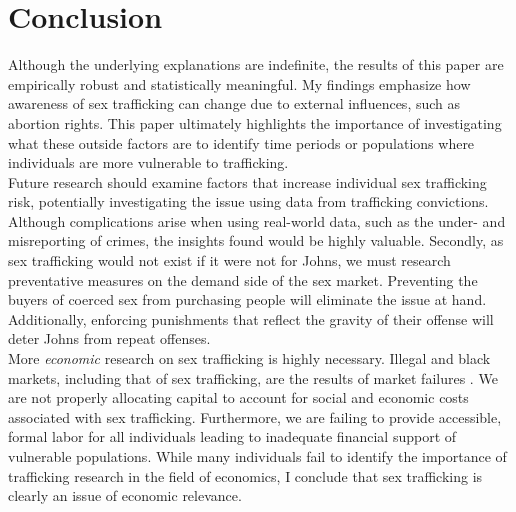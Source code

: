\documentclass[10pt]{article}
\begin{document}
\section{Conclusion}
Although the underlying explanations are indefinite, the results of this paper are empirically robust and statistically meaningful. My findings emphasize how awareness of sex trafficking can change due to external influences, such as abortion rights. This paper ultimately highlights the importance of investigating what these outside factors are to identify time periods or populations where individuals are more vulnerable to trafficking. \\
\indent Future research should examine factors that increase individual sex trafficking risk, potentially investigating the issue using data from trafficking convictions. Although complications arise when using real-world data, such as the under- and misreporting of crimes, the insights found would be highly valuable. Secondly, as sex trafficking would not exist if it were not for Johns, we must research preventative measures on the demand side of the sex market. Preventing the buyers of coerced sex from purchasing people will eliminate the issue at hand. Additionally, enforcing punishments that reflect the gravity of their offense will deter Johns from repeat offenses. \\
\indent More \textit{economic} research on sex trafficking is highly necessary. Illegal and black markets, including that of sex trafficking, are the results of market failures \citep{undp_fast_2025}. We are not properly allocating capital to account for social and economic costs associated with sex trafficking. Furthermore, we are failing to provide accessible, formal labor for all individuals leading to inadequate financial support of vulnerable populations. While many individuals fail to identify the importance of trafficking research in the field of economics, I conclude that sex trafficking is clearly an issue of economic relevance. \\

\clearpage
\nocite{*}




\end{document}
